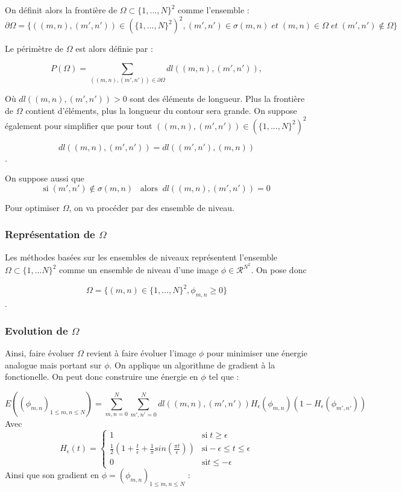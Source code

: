 On définit alors la frontière de $\Omega \subset \{ 1,...,N\}^2$ comme l'ensemble : 
\[ \partial \Omega = \{ ((m,n),(m',n')) \in (\{ 1,...,N\}^2)^2, (m',n') \in \sigma (m,n) \; et \; (m,n)\in \Omega \; et \; (m',n') \notin \Omega \}\] 

Le périmètre de $\Omega$ est alors définie par : 

\[ P(\Omega) = \sum \limits_{((m,n),(m',n')) \in \partial \Omega} dl((m,n),(m',n')),\] 

Où $ dl((m,n),(m',n')) > 0$ sont des éléments de longueur. Plus la frontière de $\Omega$ contient d'éléments, plus la longueur du contour sera grande. On suppose également pour simplifier que pour tout $((m,n), (m',n')) \in (\{ 1,...,N\}^2)^2$ 

\[ dl((m,n),(m',n')) = dl((m',n'),(m,n))\].

On suppose aussi que 
\[ \text{si} \; (m',n') \notin \sigma (m,n) \; \; \; \text{alors} \; \; dl((m,n),(m',n')) = 0\]

Pour optimiser $\Omega$, on va procéder par des ensemble de niveau. 
\subsubsection{Représentation de $\Omega$}
Les méthodes basées sur les ensembles de niveaux représentent l'ensemble $\Omega \subset \{1,...N\}^2$ comme un ensemble de niveau d'une image $\phi \in \mathcal{R}^{N^2}$. On pose donc 

\[ \Omega = \{ (m,n) \in \{1,...,N \}^2, \phi_{m,n} \geq 0 \} \].
\subsubsection{Evolution de $\Omega$}
Ainsi, faire évoluer $\Omega$ revient à faire évoluer l'image $\phi$ pour minimiser une énergie analogue mais portant sur $\phi$. On applique un algorithme de gradient à la fonctionelle. On peut donc construire une énergie en $\phi$ tel que : 

\[ E ((\phi_{m,n})_{1 \leq m,n \leq N}) = \sum \limits_{m,n = 0}^N  \sum \limits_{m',n' = 0}^N  dl((m,n),(m',n')) H_{\epsilon} (\phi_{m,n}) ( 1 - H_{\epsilon}(\phi_{m',n'})) \] 
Avec 
\[ H_{\epsilon} (t) = \left\{ \begin{matrix}
1 & \text{si} \; t \geq \epsilon \\
\frac{1}{2} (1 + \frac{t}{\epsilon} + \frac{1}{\pi}sin(\frac{\pi t}{\epsilon})) & \text{si} -\epsilon \leq t \leq \epsilon \\
0 & \text{si} t \leq - \epsilon 
\end{matrix} \right. \] 
Ainsi que son gradient en $\phi = (\phi_{m,n})_{1 \leq m,n \leq N}$ : 

